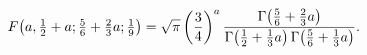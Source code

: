 \[\mathop{F\/}\nolimits\!\left(a,\tfrac{1}{2}+a;\tfrac{5}{6}+\tfrac{2}{3}a;%
\tfrac{1}{9}\right)=\sqrt{\pi}\left(\frac{3}{4}\right)^{a}\frac{\mathop{\Gamma%
\/}\nolimits\!\left(\tfrac{5}{6}+\tfrac{2}{3}a\right)}{\mathop{\Gamma\/}%
\nolimits\!\left(\tfrac{1}{2}+\tfrac{1}{3}a\right)\mathop{\Gamma\/}\nolimits\!%
\left(\tfrac{5}{6}+\tfrac{1}{3}a\right)}.\]